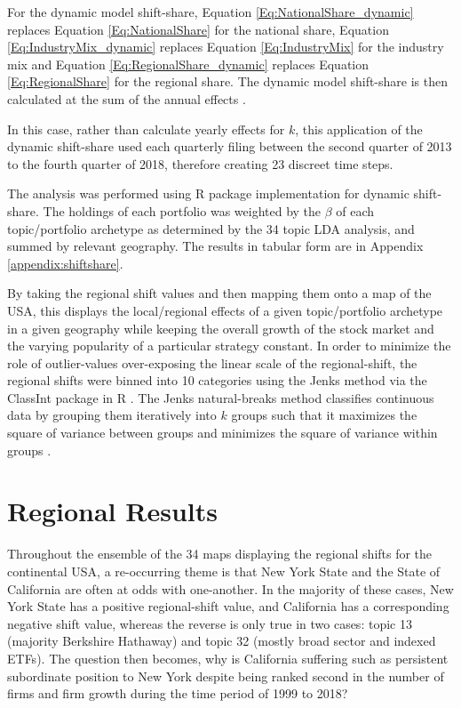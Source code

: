For the dynamic model shift-share, Equation \ref{Eq:NationalShare_dynamic} replaces Equation \ref{Eq:NationalShare} for the national share, Equation \ref{Eq:IndustryMix_dynamic} replaces Equation \ref{Eq:IndustryMix}  for the industry mix and Equation \ref{Eq:RegionalShare_dynamic} replaces Equation \ref{Eq:RegionalShare} for the regional share.  The dynamic model shift-share is then calculated at the sum of the annual effects \citep{BarffKnight88}.  

In this case, rather than calculate yearly effects for $k$, this application of the dynamic shift-share used each quarterly filing between the second quarter of 2013 to the fourth quarter of 2018, therefore creating 23 discreet time steps.

The analysis was performed using \cite{Soudis2019} R package implementation for dynamic shift-share. The holdings of each portfolio was weighted by the $\beta$ of each topic/portfolio archetype as determined by the 34 topic LDA analysis, and summed by relevant geography. The results in tabular form are in Appendix \ref{appendix:shiftshare}.

By taking the regional shift values and then mapping them onto a map of the USA, this displays the local/regional effects of a given topic/portfolio archetype in a given geography while keeping the overall growth of the stock market and the varying popularity of a particular strategy constant. In order to minimize the role of outlier-values over-exposing the linear scale of the regional-shift, the regional shifts were binned into 10 categories using the Jenks method via the ClassInt package in R \citep{classInt}.  The Jenks natural-breaks method classifies continuous data by grouping them iteratively into $k$ groups such that it maximizes the square of variance between groups and minimizes the square of variance within groups \citep{jenks1967data}.  


\section{Regional Results}

Throughout the ensemble of the 34 maps displaying the regional shifts for the continental USA, a re-occurring theme is that New York State and the State of California are often at odds with one-another. In the majority of these cases, New York State has a positive regional-shift value, and California has a corresponding negative shift value, whereas the reverse is only true in two cases: topic 13 (majority Berkshire Hathaway) and topic 32 (mostly broad sector and indexed ETFs).   The question then becomes, why is California suffering such as persistent subordinate position to New York despite being ranked second in the number of firms and firm growth during the time period of 1999 to 2018?  

